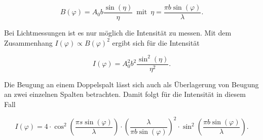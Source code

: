 \begin{equation*}
  B(\varphi) = A_0 b \frac{\sin(\eta)}{\eta} \, \, \, \text{mit} \, \, \, \eta = \frac{\pi b \sin(\varphi)}{\lambda}.
\end{equation*}


Bei Lichtmessungen ist es nur möglich die Intensität zu messen. Mit dem Zusammenhang
$I(\varphi) \propto B(\varphi)^2$ ergibt sich für die Intensität

\begin{equation}
  I(\varphi) = A_0^2 b^2 \frac{\sin^2(\eta)}{\eta^2}.
  \label{eq:1}
\end{equation}

Die Beugung an einem Doppelspalt lässt sich auch als Überlagerung von Beugung an zwei
einzelnen Spalten betrachten. Damit folgt für die Intensität in diesem Fall

\begin{equation}
  I(\varphi) = 4 \cdot \cos^2\left(\frac{\pi s \sin(\varphi)}{\lambda}\right) \cdot
  \left(\frac{\lambda}{\pi b \sin(\varphi)}\right)^2 \cdot \sin^2\left(\frac{\pi b \sin(\varphi)}{\lambda}\right).
  \label{eq:2}
\end{equation}
